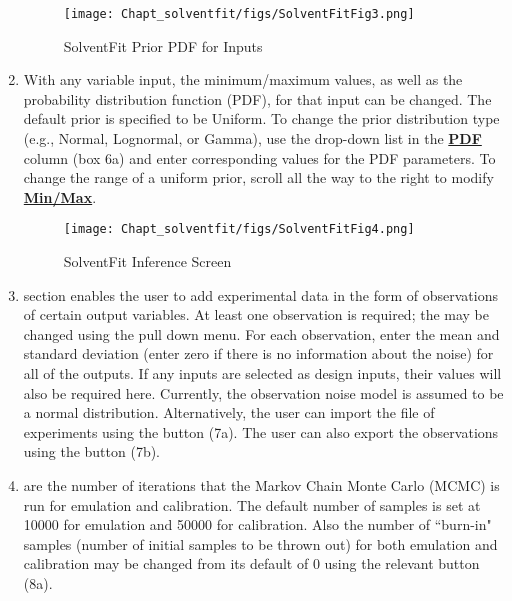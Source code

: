\begin{enumerate}
\begin{figure}[h!]
\centering \texttt{[image: Chapt\_solventfit/figs/SolventFitFig3.png]}
\caption{SolventFit Prior PDF for Inputs}
\label{fig:SolventFit_Fig_3}
\end{figure}

\item {} With any variable input, the minimum/maximum values, as well as the probability distribution function (PDF), for that input can be changed.  The default prior is specified to be Uniform.   To change the prior distribution type (e.g.,  Normal, Lognormal, or Gamma), use the drop-down list in the \textbf{\underline{PDF}} column (box 6a) and enter corresponding values for the PDF parameters. To change the range of a uniform prior, scroll all the way to the right to modify \textbf{\underline{Min/Max}}. 

\begin{figure}[h!]
\centering \texttt{[image: Chapt\_solventfit/figs/SolventFitFig4.png]}
\caption{SolventFit Inference Screen}
\label{fig:SolventFit_Fig_4}
\end{figure}

\item {} section enables the user to add experimental data in the form of observations of certain output variables.
   At least one observation is required; the  may be changed using the pull down menu.  For each observation, enter the mean and standard deviation (enter zero if there is no information about the noise) for all of the outputs.  If any inputs are selected as design inputs, their values will also be required here.  Currently, the observation noise model is assumed to be a normal distribution.  
Alternatively, the user can import the file of experiments using the  button (7a).  The user can also export the observations using the  button (7b).    

\item {} are the number of iterations that the Markov Chain Monte Carlo (MCMC) is run for emulation and calibration.  The default number of samples is set at 10000 for emulation and 50000 for calibration.  Also the number of ``burn-in" samples (number of initial samples to be thrown out) for both emulation and calibration may be changed from its default of 0 using the relevant button (8a).   


\end{enumerate}
